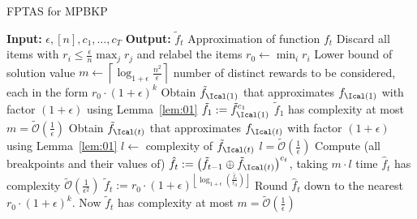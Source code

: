 \documentclass[11pt]{article}
\begin{document}
\begin{algorithm}[ht]
\footnotesize
\caption{FPTAS for MPBKP}
\label{alg:MPBKP}
\begin{algorithmic}[1]
	\Statex \textbf{Input:} $\epsilon, [n], c_1,\ldots, c_T$  
	\Statex \textbf{Output:} $\tilde{f}_t$ \Comment Approximation of function $f_t$
	\State Discard all items with $r_i\le \frac{\epsilon}{n}\max_jr_j$ and relabel the items 
	\State $r_0\gets \min_ir_i$ \Comment Lower bound of solution value
	\State $m\gets \left\lceil\log_{1+\epsilon}\frac{n^2}{\epsilon}\right\rceil$ \Comment number of distinct rewards to be considered, each in the form $r_0\cdot(1+\epsilon)^k$
	\State Obtain $\tilde{f}_{\Ical(1)}$ that approximates $f_{\Ical(1)}$ with factor $(1+\epsilon)$ using Lemma~\ref{lem:01}
	\State $\tilde{f}_1:= \tilde{f}_{\Ical(1)}^{c_1}$ \Comment $\tilde{f}_1$ has complexity at most $m=\tilde{\mathcal{O}}\left(\frac{1}{\epsilon}\right)$
	\State Obtain $\tilde{f}_{\Ical(t)}$ that approximates $f_{\Ical(t)}$ with factor $(1+\epsilon)$ using Lemma~\ref{lem:01}
	\State $l\gets$ complexity of $\tilde{f}_{\Ical(t)}$ \Comment $l=\tilde{\mathcal{O}}\left(\frac{1}{\epsilon}\right)$
	\State Compute (all breakpoints and their values of) $\hat{f}_{t}:= \left(\tilde{f}_{t-1}\oplus \tilde{f}_{\Ical(t)}\right)^{c_t}$, taking $m\cdot l$ time
\Comment $\hat{f}_t$ has complexity $\tilde{\mathcal{O}}\left(\frac{1}{\epsilon^2}\right)$
	\State $\tilde{f}_t := r_0\cdot (1+\epsilon)^{\left\lfloor\log_{1+\epsilon}\left(\frac{\hat{f}_t}{r_0}\right)\right\rfloor}$ \Comment Round $\hat{f}_t$ down to the nearest $r_0\cdot (1+\epsilon)^k$. Now $\tilde{f}_t$ has complexity at most $m=\tilde{\mathcal{O}}\left(\frac{1}{\epsilon}\right)$
	\EndFor
\end{algorithmic}
\end{algorithm}
\end{document}
